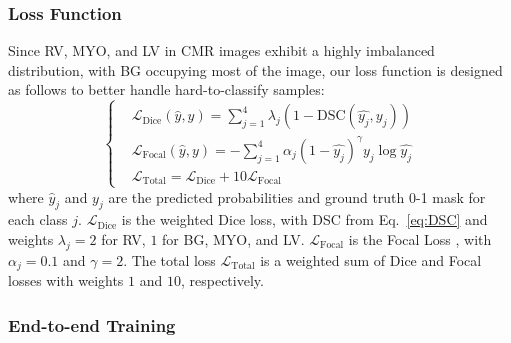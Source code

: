 \subsubsection{Loss Function}
Since RV, MYO, and LV in CMR images exhibit a highly imbalanced distribution, with BG occupying most of the image, our loss function is designed as follows to better handle hard-to-classify samples: 
\begin{equation}
    \left\{
\begin{aligned}
& \mathcal{L}_{\text{Dice}}(\hat{y}, y) = \sum_{j=1}^{4}\lambda_{j}(1-\text{DSC}(\hat{y_{j}},y_{j})) \\
& \mathcal{L}_{\text{Focal}}(\hat{y}, y) = -\sum_{j=1}^{4}\alpha_{j}(1-\hat{y_{j}})^{\gamma}y_{j}\log{\hat{y_{j}}} \\
& \mathcal{L}_{\text{Total}} = \mathcal{L}_{\text{Dice} } + 10\mathcal{L}_{\text{Focal}}
\end{aligned}
\right.
\label{eq:loss function}
\end{equation}
where \(\hat{y}_{j}\) and \(y_{j}\) are the predicted probabilities and ground truth 0-1 mask for each class \(j\). \(\mathcal{L}_{\text{Dice}}\) is the weighted Dice loss, with DSC from Eq.~\ref{eq:DSC} and weights \(\lambda_{j} = 2\) for RV, \(1\) for BG, MYO, and LV. \(\mathcal{L}_{\text{Focal}}\) is the Focal Loss \cite{lin2017focal}, with \(\alpha_{j} = 0.1\) and \(\gamma = 2\). The total loss \(\mathcal{L}_{\text{Total}}\) is a weighted sum of Dice and Focal losses with weights \(1\) and \(10\), respectively.


\subsubsection{End-to-end Training}
\label{sec:end-to-end training}


